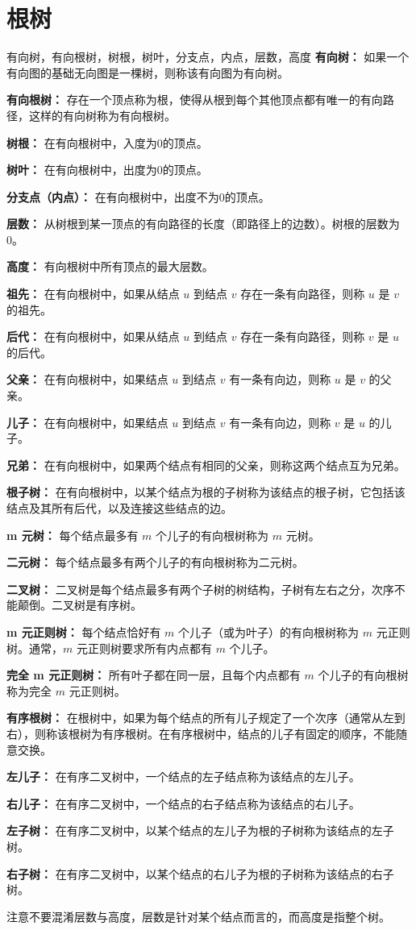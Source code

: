 \documentclass[lang=cn,11pt]{elegantbook}
\begin{document}
\section{根树}
\begin{definition}{有向树，有向根树，树根，树叶，分支点，内点，层数，高度}
\textbf{有向树：} 如果一个有向图的基础无向图是一棵树，则称该有向图为有向树。

\textbf{有向根树：} 存在一个顶点称为根，使得从根到每个其他顶点都有唯一的有向路径，这样的有向树称为有向根树。

\textbf{树根：} 在有向根树中，入度为0的顶点。

\textbf{树叶：} 在有向根树中，出度为0的顶点。

\textbf{分支点（内点）：} 在有向根树中，出度不为0的顶点。

\textbf{层数：} 从树根到某一顶点的有向路径的长度（即路径上的边数）。树根的层数为0。

\textbf{高度：} 有向根树中所有顶点的最大层数。

\textbf{祖先：} 在有向根树中，如果从结点 $u$ 到结点 $v$ 存在一条有向路径，则称 $u$ 是 $v$ 的祖先。

\textbf{后代：} 在有向根树中，如果从结点 $u$ 到结点 $v$ 存在一条有向路径，则称 $v$ 是 $u$ 的后代。

\textbf{父亲：} 在有向根树中，如果结点 $u$ 到结点 $v$ 有一条有向边，则称 $u$ 是 $v$ 的父亲。

\textbf{儿子：} 在有向根树中，如果结点 $u$ 到结点 $v$ 有一条有向边，则称 $v$ 是 $u$ 的儿子。

\textbf{兄弟：} 在有向根树中，如果两个结点有相同的父亲，则称这两个结点互为兄弟。

\textbf{根子树：} 在有向根树中，以某个结点为根的子树称为该结点的根子树，它包括该结点及其所有后代，以及连接这些结点的边。

\textbf{m 元树：} 每个结点最多有 $m$ 个儿子的有向根树称为 $m$ 元树。

\textbf{二元树：} 每个结点最多有两个儿子的有向根树称为二元树。

\textbf{二叉树：} 二叉树是每个结点最多有两个子树的树结构，子树有左右之分，次序不能颠倒。二叉树是有序树。

\textbf{m 元正则树：} 每个结点恰好有 $m$ 个儿子（或为叶子）的有向根树称为 $m$ 元正则树。通常，$m$ 元正则树要求所有内点都有 $m$ 个儿子。

\textbf{完全 m 元正则树：} 所有叶子都在同一层，且每个内点都有 $m$ 个儿子的有向根树称为完全 $m$ 元正则树。

\textbf{有序根树：} 在根树中，如果为每个结点的所有儿子规定了一个次序（通常从左到右），则称该根树为有序根树。在有序根树中，结点的儿子有固定的顺序，不能随意交换。

\textbf{左儿子：} 在有序二叉树中，一个结点的左子结点称为该结点的左儿子。

\textbf{右儿子：} 在有序二叉树中，一个结点的右子结点称为该结点的右儿子。

\textbf{左子树：} 在有序二叉树中，以某个结点的左儿子为根的子树称为该结点的左子树。

\textbf{右子树：} 在有序二叉树中，以某个结点的右儿子为根的子树称为该结点的右子树。
\end{definition}
注意不要混淆层数与高度，层数是针对某个结点而言的，而高度是指整个树。
\end{document}
